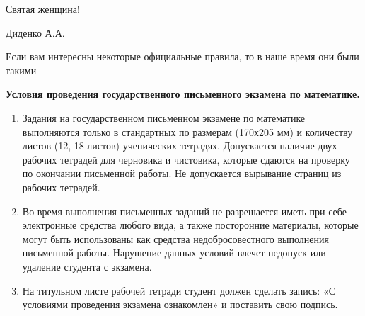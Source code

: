Святая женщина!

\mbox{}

Диденко А.А.

\newpage
Если вам интересны некоторые официальные правила, то в наше время они были такими

\textbf{Условия проведения государственного письменного экзамена по математике.}

\begin{enumerate}
\item Задания на государственном письменном экзамене по математике выполняются только в
стандартных по размерам (170х205 мм) и количеству листов (12, 18 листов) ученических тетрадях.
Допускается наличие двух рабочих тетрадей для черновика и чистовика, которые сдаются на
проверку по окончании письменной работы. Не допускается вырывание страниц из рабочих
тетрадей.
\item Во время выполнения письменных заданий не разрешается иметь при себе электронные
средства любого вида, а также посторонние материалы, которые могут быть использованы как
средства недобросовестного выполнения письменной работы.
Нарушение данных условий влечет недопуск или удаление студента с экзамена.
\item На титульном листе рабочей тетради студент должен сделать запись:
«С условиями проведения экзамена ознакомлен» и поставить свою подпись.
\end{enumerate}